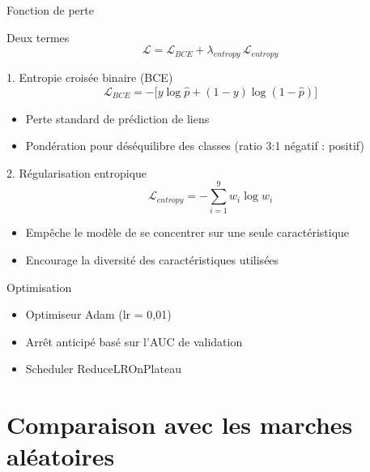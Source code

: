 \documentclass[9pt,aspectratio=169,professionalfonts]{beamer}
\begin{document}
\begin{frame}{Fonction de perte}
\begin{block}{Deux termes}
$$\boxed{\mathcal L = \mathcal L_{BCE} + \lambda_{entropy}\,\mathcal L_{entropy}}$$
\end{block}

\begin{block}{1. Entropie croisée binaire (BCE)}
$$\mathcal L_{BCE} = -\bigl[y\log\hat p + (1-y)\log(1-\hat p)\bigr]$$
\begin{itemize}
    \item Perte standard de prédiction de liens
    \item Pondération pour déséquilibre des classes (ratio 3:1 négatif : positif)
\end{itemize}
\end{block}

\begin{block}{2. Régularisation entropique}
$$\mathcal L_{entropy} = -\sum_{i=1}^{9} w_i\log w_i$$
\begin{itemize}
    \item Empêche le modèle de se concentrer sur une seule caractéristique
    \item Encourage la diversité des caractéristiques utilisées
\end{itemize}
\end{block}

\begin{block}{Optimisation}
\begin{itemize}
    \item Optimiseur Adam (lr = 0,01)
    \item Arrêt anticipé basé sur l'AUC de validation
    \item Scheduler ReduceLROnPlateau
\end{itemize}
\end{block}
\end{frame}

\section{Comparaison avec les marches aléatoires}
\end{document}
